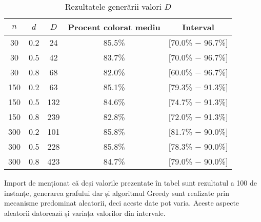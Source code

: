 \begin{table}[H]
\centering
\caption{Rezultatele generării valori $D$}
\begin{tabular}{ccccc}
\toprule
$n$ & $d$ & $D$ & Procent colorat mediu & Interval\\
\midrule
30  & 0.2 & 24       & 85.5\% & [70.0\% $-$ 96.7\%] \\
30  & 0.5 & 42       & 83.7\% & [70.0\% $-$ 96.7\%]\\
30  & 0.8 & 68       & 82.0\% & [60.0\% $-$ 96.7\%]\\
150 & 0.2 & 63       & 85.1\% & [79.3\% $-$ 91.3\%]\\
150 & 0.5 & 132      & 84.6\% & [74.7\% $-$ 91.3\%]\\
150 & 0.8 & 239      & 82.8\% & [72.0\% $-$ 91.3\%]\\
300 & 0.2 & 101      & 85.8\% & [81.7\% $-$ 90.0\%]\\
300 & 0.5 & 228      & 85.8\% & [78.3\% $-$ 90.0\%]\\
300 & 0.8 & 423      & 84.7\% & [79.0\% $-$ 90.0\%]\\
\bottomrule
\end{tabular}\label{tab:rezultate_booktabs}
\end{table}
Import de menționat că deși valorile prezentate în tabel sunt rezultatul a 100 de instanțe, generarea grafului dar și algoritmul Greedy sunt realizate prin mecanisme predominat aleatorii, deci aceste date pot varia. Aceste aspecte aleatorii datorează și variața valorilor din intervale.

